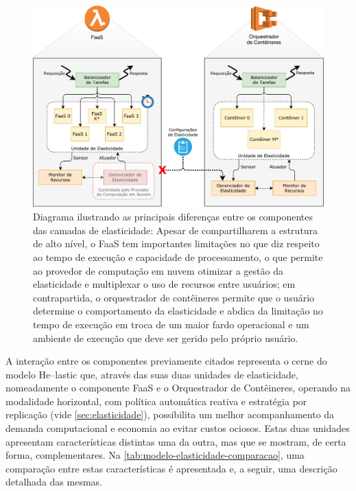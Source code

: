\documentclass[english,brazilian]{UNISINOSmonografia} %
\newcommand\defaultFigureWidth{0.9}
\begin{document}
\begin{figure}[tb]
\centering%
\begin{minipage}{\defaultFigureWidth\textwidth}
	\caption{Diagrama ilustrando as principais diferenças entre os componentes das camadas de elasticidade: Apesar de compartilharem a estrutura de alto nível, o FaaS tem importantes limitações no que diz respeito ao tempo de execução e capacidade de processamento, o que permite ao provedor de computação em nuvem otimizar a gestão da elasticidade e multiplexar o uso de recursos entre usuários; em contrapartida, o orquestrador de contêineres permite que o usuário determine o comportamento da elasticidade e abdica da limitação no tempo de execução em troca de um maior fardo operacional e um ambiente de execução que deve ser gerido pelo próprio usuário.}
	\label{fig:modelo-componentes-explodidos}
	\includegraphics[width=\textwidth]{modelo-componentes-explodidos}
\end{minipage}
\end{figure}







A interação entre os componentes previamente citados representa o cerne do modelo \textsf{He}--lastic que, através das suas duas unidades de elasticidade, nomeadamente o componente FaaS e o Orquestrador de Contêineres, operando na modalidade horizontal, com política automática reativa e estratégia por replicação (vide \autoref{sec:elasticidade}), possibilita um melhor acompanhamento da demanda computacional e economia ao evitar custos ociosos.
Estas duas unidades apresentam características distintas uma da outra, mas que se mostram, de certa forma, complementares.
Na \autoref{tab:modelo-elasticidade-comparacao}, uma comparação entre estas características é apresentada e, a seguir, uma descrição detalhada das mesmas.
\end{document}
